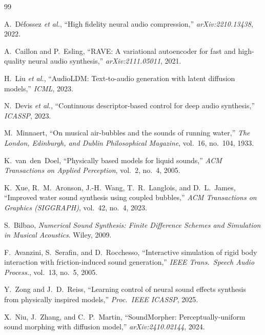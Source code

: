 \documentclass[a4paper,11pt,twoside]{article}
\begin{document}
\renewcommand{\refname}{}
\vspace{-3.5em}
\begin{thebibliography}{99}
\setlength{\itemsep}{0pt}

A.~D{\'e}fossez \emph{et al.},
``High fidelity neural audio compression,''
\emph{arXiv:2210.13438}, 2022.

A.~Caillon and P.~Esling,
``RAVE: A variational autoencoder for fast and high-quality neural audio synthesis,''
\emph{arXiv:2111.05011}, 2021.

H.~Liu \emph{et al.},
``AudioLDM: Text-to-audio generation with latent diffusion models,''
\emph{ICML}, 2023.

N.~Devis \emph{et al.},
``Continuous descriptor-based control for deep audio synthesis,''
\emph{ICASSP}, 2023.

M.~Minnaert,
``On musical air-bubbles and the sounds of running water,''
\emph{The London, Edinburgh, and Dublin Philosophical Magazine}, vol.~16, no.~104, 1933.

K.~van~den~Doel,
``Physically based models for liquid sounds,''
\emph{ACM Transactions on Applied Perception}, vol.~2, no.~4, 2005.

K.~Xue, R.~M.~Aronson, J.-H.~Wang, T.~R.~Langlois, and D.~L.~James,
``Improved water sound synthesis using coupled bubbles,''
\emph{ACM Transactions on Graphics (SIGGRAPH)}, vol.~42, no.~4, 2023.

S.~Bilbao,
\emph{Numerical Sound Synthesis: Finite Difference Schemes and Simulation in Musical Acoustics}.
Wiley, 2009.

F.~Avanzini, S.~Serafin, and D.~Rocchesso,
``Interactive simulation of rigid body interaction with friction-induced sound generation,''
\emph{IEEE Trans.\ Speech Audio Process.}, vol.~13, no.~5, 2005.

Y.~Zong and J.~D.~Reiss,
``Learning control of neural sound effects synthesis from physically inspired models,''
\emph{Proc.\ IEEE ICASSP}, 2025.

X.~Niu, J.~Zhang, and C.~P.~Martin,
``SoundMorpher: Perceptually-uniform sound morphing with diffusion model,''
\emph{arXiv:2410.02144}, 2024.


\end{thebibliography}
\end{document}
